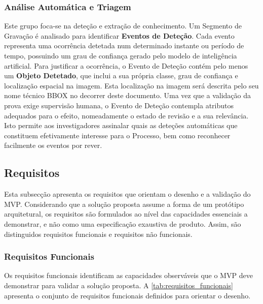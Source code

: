 \subsubsection{Análise Automática e Triagem}
Este grupo foca-se na deteção e extração de conhecimento. Um Segmento de Gravação é analisado para identificar \textbf{Eventos de Deteção}. Cada evento representa uma ocorrência detetada num determinado instante ou período de tempo, possuindo um grau de confiança gerado pelo modelo de inteligência artificial. Para justificar a ocorrência, o Evento de Deteção contém pelo menos um \textbf{Objeto Detetado}, que inclui a sua própria classe, grau de confiança e localização espacial na imagem. Esta localização na imagem será descrita pelo seu nome técnico \gls{BBOX} no decorrer deste documento.
Uma vez que a validação da prova exige supervisão humana, o Evento de Deteção contempla atributos adequados para o efeito, nomeadamente o estado de revisão e a sua relevância. Isto permite aos investigadores assinalar quais as deteções automáticas que constituem efetivamente interesse para o Processo, bem como reconhecer facilmente os eventos por rever.

\subsection{Requisitos}

Esta subsecção apresenta os requisitos que orientam o desenho e a validação do \gls{MVP}. Considerando que a solução proposta assume a forma de um protótipo arquitetural, os requisitos são formulados ao nível das capacidades essenciais a demonstrar, e não como uma especificação exaustiva de produto. Assim, são distinguidos requisitos funcionais e requisitos não funcionais.

\subsubsection{Requisitos Funcionais}
Os requisitos funcionais identificam as capacidades observáveis que o \gls{MVP} deve demonstrar para validar a solução proposta. A \autoref{tab:requisitos_funcionais} apresenta o conjunto de requisitos funcionais definidos para orientar o desenho.

